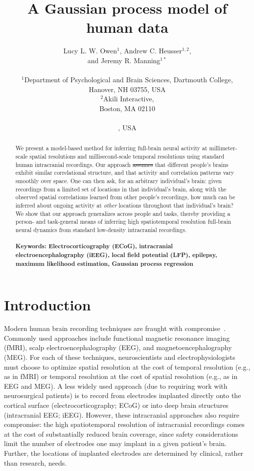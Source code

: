 \documentclass[10pt]{article}
\title{A Gaussian process model of human \DIFdelbegin \DIFdel{electrocorticographic }\DIFdelend \DIFaddbegin \DIFadd{e\-lect\-ro\-cort\-i\-co\-graph\-ic }\DIFaddend data}
\author{
  Lucy L. W. Owen$^{1}$,
  \DIFaddbegin \DIFadd{Tudor A. Muntianu$^{1}$,
  }\DIFaddend Andrew C. Heusser$^{1, 2}$, \DIFaddbegin \\
  \DIFadd{Patrick Daly$^{3}$,
  Katherine Scangos$^{3}$, }\DIFaddend and
  Jeremy R. Manning$^{1\ast}$\\\\
$^{1}$Department of Psychological and Brain Sciences, Dartmouth College,\\
Hanover, NH 03755, USA\\
$^{2}$Akili Interactive,\\
Boston, MA 02110\DIFaddbegin \DIFadd{, USA}\\
\DIFadd{$^{3}$Weill Institute for Neurosciences, University of California, San Francisco,}\\
\DIFadd{San Francisco, CA 94121}\DIFaddend , USA}
\date{}
\providecommand{\DIFaddtex}[1]{{\protect\color{blue}\uwave{#1}}} %
\providecommand{\DIFdeltex}[1]{{\protect\color{red}\sout{#1}}}                      %
\providecommand{\DIFaddbegin}{} %
\providecommand{\DIFaddend}{} %
\providecommand{\DIFdelbegin}{} %
\providecommand{\DIFdelend}{} %
\providecommand{\DIFadd}[1]{\texorpdfstring{\DIFaddtex{#1}}{#1}} %
\providecommand{\DIFdel}[1]{\texorpdfstring{\DIFdeltex{#1}}{}} %
\newcommand{\DIFscaledelfig}{0.5}
\newlength{\DIFdelgraphicswidth} %
\newlength{\DIFdelgraphicsheight} %
\newcommand{\DIFaddincludegraphics}[2][]{{\color{blue}\fbox{\DIFOincludegraphics[#1]{#2}}}} %
\newcommand{\DIFdelincludegraphics}[2][]{%
\sbox{\DIFdelgraphicsbox}{\DIFOincludegraphics[#1]{#2}}%
\settoboxwidth{\DIFdelgraphicswidth}{\DIFdelgraphicsbox} %
\settoboxtotalheight{\DIFdelgraphicsheight}{\DIFdelgraphicsbox} %
\scalebox{\DIFscaledelfig}{%
\parbox[b]{\DIFdelgraphicswidth}{\usebox{\DIFdelgraphicsbox}\\[-\baselineskip] \rule{\DIFdelgraphicswidth}{0em}}\llap{\resizebox{\DIFdelgraphicswidth}{\DIFdelgraphicsheight}{%
\setlength{\unitlength}{\DIFdelgraphicswidth}%
\begin{picture}(1,1)%
\thicklines\linethickness{2pt} %
{\color[rgb]{1,0,0}\put(0,0){\framebox(1,1){}}}%
{\color[rgb]{1,0,0}\put(0,0){\line( 1,1){1}}}%
{\color[rgb]{1,0,0}\put(0,1){\line(1,-1){1}}}%
\end{picture}%
}\hspace*{3pt}}} %
} %
\DeclareRobustCommand{\DIFaddbegin}{\DIFOaddbegin \let\includegraphics\DIFaddincludegraphics} %
\DeclareRobustCommand{\DIFaddend}{\DIFOaddend \let\includegraphics\DIFOincludegraphics} %
\DeclareRobustCommand{\DIFdelbegin}{\DIFOdelbegin \let\includegraphics\DIFdelincludegraphics} %
\DeclareRobustCommand{\DIFdelend}{\DIFOaddend \let\includegraphics\DIFOincludegraphics} %
\begin{document}
\baselineskip24pt
\maketitle

\begin{abstract}
  We present a model-based method for inferring full-brain neural
  activity at millimeter-scale spatial resolutions and
  millisecond-scale temporal resolutions using standard human
  intracranial recordings.  Our approach \DIFdelbegin \DIFdel{assumes }\DIFdelend \DIFaddbegin \DIFadd{makes the simplifying
  assumptions }\DIFaddend that different people's brains exhibit similar
  correlational structure, and that activity and correlation patterns
  vary smoothly over space.  One can then ask, for an arbitrary
  individual's brain: given recordings from a limited set of locations
  in that individual's brain, along with the observed spatial
  correlations learned from other people's recordings, how much can be
  inferred about ongoing activity at \textit{other} locations
  throughout that individual's brain?  We show that our approach
  generalizes across people and tasks, thereby providing a person- and
  task-general means of inferring high spatiotemporal resolution
  full-brain neural dynamics from standard low-density intracranial
  recordings.
  \\\\
  \footnotesize{\textbf{Keywords: Electrocorticography (ECoG),
      intracranial electroencephalography (iEEG), local field
      potential (LFP), epilepsy, maximum likelihood estimation,
      Gaussian process regression}}
\end{abstract}

\section*{Introduction}
Modern human brain recording techniques are fraught with
compromise~\citep{SejnEtal14}.  Commonly used approaches include
functional magnetic resonance imaging (fMRI), scalp
electroencephalography (EEG), and magnetoencephalography (MEG).  For
each of these techniques, neuroscientists and electrophysiologists
must choose to optimize spatial resolution at the cost of temporal
resolution (e.g., as in fMRI) or temporal resolution at the cost of
spatial resolution (e.g., as in EEG and MEG).  A less widely used
approach (due to requiring work with neurosurgical patients) is to
record from electrodes implanted directly onto the cortical surface
(electrocorticography; ECoG) or into deep brain structures
(intracranial EEG; iEEG).  However, these intracranial approaches also
require compromise: the high spatiotemporal resolution of
intracranial recordings comes at the cost of substantially reduced
brain coverage, since safety considerations limit the number of
electrodes one may implant in a given patient's brain.  Further, the
locations of implanted electrodes are determined by clinical, rather
than research, needs.
\end{document}

